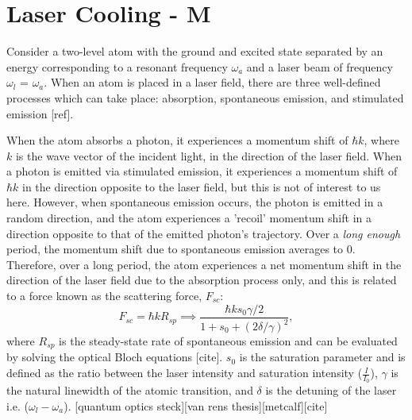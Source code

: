 \documentclass[12pt,twoside]{article}
\begin{document}
\section{Laser Cooling - M}
Consider a two-level atom with the ground and excited state separated by an energy corresponding to a resonant frequency $\omega_a$ and a laser beam of frequency $\omega_l$ = $\omega_a$. When an atom is placed in a laser field, there are three well-defined processes which can take place: absorption, spontaneous emission, and stimulated emission [ref].

When the atom absorbs a photon, it experiences a momentum shift of $\hbar k$, where $k$ is the wave vector of the incident light, in the direction of the laser field. When a photon is emitted via stimulated emission, it experiences a momentum shift of $\hbar k$ in the direction opposite to the laser field, but this is not of interest to us here. However, when spontaneous emission occurs, the photon is emitted in a random direction, and the atom experiences a 'recoil' momentum shift in a direction opposite to that of the emitted photon's trajectory. Over a \textit{long enough} period, the momentum shift due to spontaneous emission averages to 0. Therefore, over a long period, the atom experiences a net momentum shift in the direction of the laser field due to the absorption process only, and this is related to a force known as the scattering force, $F_{sc}$:
\begin{equation}
    F_{sc} = \hbar k R_{sp} \implies \frac{\hbar k s_0 \gamma/2}{1 + s_0 + (2\delta/\gamma)^2},
    \label{eqn: scattering force 1 beam}
\end{equation}
where $R_{sp}$ is the steady-state rate of spontaneous emission and can be evaluated by solving the optical Bloch equations [cite]. $s_0$ is the saturation parameter and is defined as the ratio between the laser intensity and saturation intensity ($\frac{I}{I_0}$), $\gamma$ is the natural linewidth of the atomic transition, and $\delta$ is the detuning of the laser i.e. ($\omega_l - \omega_a$). [quantum optics steck][van rens thesis][metcalf][cite]
\end{document}
